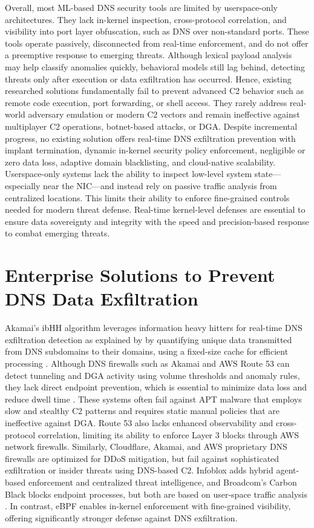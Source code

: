 \documentclass [11pt, proquest] {uwthesis}[2020/02/24]
\begin{document}
Overall, most ML-based DNS security tools are limited by userspace-only architectures. They lack in-kernel inspection, cross-protocol correlation, and visibility into port layer obfuscation, such as DNS over non-standard ports. These tools operate passively, disconnected from real-time enforcement, and do not offer a preemptive response to emerging threats. Although lexical payload analysis may help classify anomalies quickly, behavioral models still lag behind, detecting threats only after execution or data exfiltration has occurred. Hence, existing researched solutions fundamentally fail to prevent advanced C2 behavior such as remote code execution, port forwarding, or shell access. They rarely address real-world adversary emulation or modern C2 vectors and remain ineffective against multiplayer C2 operations, botnet-based attacks, or DGA. Despite incremental progress, no existing solution offers real-time DNS exfiltration prevention with implant termination, dynamic in-kernel security policy enforcement, negligible or zero data loss, adaptive domain blacklisting, and cloud-native scalability. Userspace-only systems lack the ability to inspect low-level system state—especially near the NIC—and instead rely on passive traffic analysis from centralized locations. This limits their ability to enforce fine-grained controls needed for modern threat defense. Real-time kernel-level defenses are essential to ensure data sovereignty and integrity with the speed and precision-based response to combat emerging threats.

\section{Enterprise Solutions to Prevent DNS Data Exfiltration}
Akamai’s ibHH algorithm leverages information heavy hitters for real-time DNS exfiltration detection as explained by \citeauthor{ozery2023information} by quantifying unique data transmitted from DNS subdomains to their domains, using a fixed-size cache for efficient processing \cite{ozery2023information}. Although DNS firewalls such as Akamai and AWS Route 53 can detect tunneling and DGA activity using volume thresholds and anomaly rules, they lack direct endpoint prevention, which is essential to minimize data loss and reduce dwell time \cite{ansari2020reinforcing}. These systems often fail against APT malware that employs slow and stealthy C2 patterns and requires static manual policies that are ineffective against DGA. 
Route 53 also lacks enhanced observability and cross-protocol correlation, limiting its ability to enforce Layer 3 blocks through AWS network firewalls. Similarly, Cloudflare, Akamai, and AWS proprietary DNS firewalls are optimized for DDoS mitigation, but fail against sophisticated exfiltration or insider threats using DNS-based C2. Infoblox adds hybrid agent-based enforcement and centralized threat intelligence, and Broadcom’s Carbon Black blocks endpoint processes, but both are based on user-space traffic analysis \cite{ahmed2019monitoring}. In contrast, eBPF enables in-kernel enforcement with fine-grained visibility, offering significantly stronger defense against DNS exfiltration.
\end{document}
